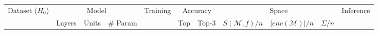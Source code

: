 
\centering

	\begin{tabular}{l ccr rrrrrrr}
		\toprule
        \multirow{2}{*}{Dataset ($H_0$)} & \multicolumn{3}{c}{Model} & \multirow{2}{*}{Training} & \multicolumn{2}{c}{Accuracy} & \multicolumn{3}{c}{Space}& \multirow{2}{*}{Inference} \\
                                           \cmidrule(lr){2-4}                                      \cmidrule(lr){6-7}             \cmidrule(lr){8-10}
                                         & Layers & Units     & \# Param       &                          & Top       & Top-3            & $S(ℳ,f) / n$ & $|enc(ℳ)| / n$ & $\Sigma / n$&  \\


\end{tabular}
